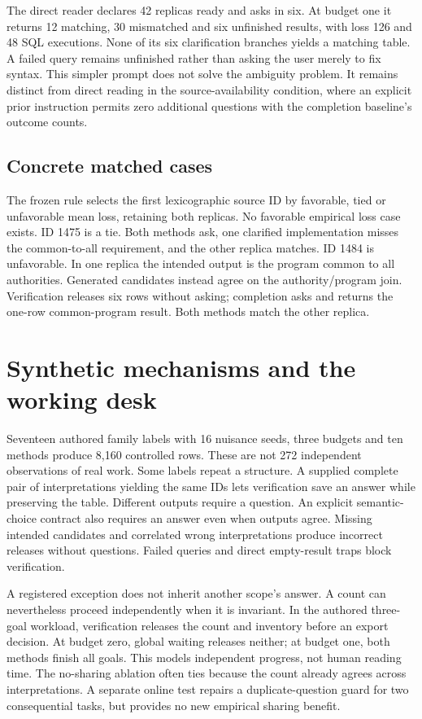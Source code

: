 \documentclass[11pt]{article}
\begin{document}
The direct reader declares 42 replicas ready and asks in six. At budget one it returns 12 matching, 30 mismatched and six unfinished results, with loss 126 and 48 SQL executions. None of its six clarification branches yields a matching table. A failed query remains unfinished rather than asking the user merely to fix syntax. This simpler prompt does not solve the ambiguity problem. It remains distinct from direct reading in the source-availability condition, where an explicit prior instruction permits zero additional questions with the completion baseline's outcome counts.

\subsection{Concrete matched cases}
The frozen rule selects the first lexicographic source ID by favorable, tied or unfavorable mean loss, retaining both replicas. No favorable empirical loss case exists. ID 1475 is a tie. Both methods ask, one clarified implementation misses the common-to-all requirement, and the other replica matches. ID 1484 is unfavorable. In one replica the intended output is the program common to all authorities. Generated candidates instead agree on the authority/program join. Verification releases six rows without asking; completion asks and returns the one-row common-program result. Both methods match the other replica.

\section{Synthetic mechanisms and the working desk}
Seventeen authored family labels with 16 nuisance seeds, three budgets and ten methods produce 8,160 controlled rows. These are not 272 independent observations of real work. Some labels repeat a structure. A supplied complete pair of interpretations yielding the same IDs lets verification save an answer while preserving the table. Different outputs require a question. An explicit semantic-choice contract also requires an answer even when outputs agree. Missing intended candidates and correlated wrong interpretations produce incorrect releases without questions. Failed queries and direct empty-result traps block verification.

A registered exception does not inherit another scope's answer. A count can nevertheless proceed independently when it is invariant. In the authored three-goal workload, verification releases the count and inventory before an export decision. At budget zero, global waiting releases neither; at budget one, both methods finish all goals. This models independent progress, not human reading time. The no-sharing ablation often ties because the count already agrees across interpretations. A separate online test repairs a duplicate-question guard for two consequential tasks, but provides no new empirical sharing benefit.
\end{document}
